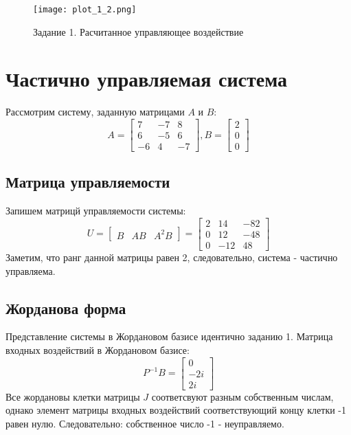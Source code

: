 \begin{figure}[]
    \centering
    \texttt{[image: plot\_1\_2.png]}
    \caption{\label{fig:The-caption-1}Задание 1. Расчитанное управляющее воздействие}
\end{figure}
\pagebreak

\section{Частично управляемая система}
Рассмотрим систему, заданную матрицами $A$ и $B$:
\begin{equation*}
    A = \begin{bmatrix}
        7 & -7 & 8 \\
        6 & -5 & 6 \\
        -6 & 4 & -7
    \end{bmatrix},
    B = \begin{bmatrix}
        2 \\ 0 \\ 0
    \end{bmatrix}
\end{equation*}

\subsection{Матрица управляемости}
Запишем матрицй управляемости системы:
\begin{equation*}
    U = \begin{bmatrix}
        B & AB & A^2B 
    \end{bmatrix}
     = 
    \begin{bmatrix}
        2 & 14 & -82 \\
        0 & 12 & -48 \\
        0 & -12 & 48
    \end{bmatrix}
\end{equation*}
Заметим, что ранг данной матрицы равен 2, следовательно, система - частично управляема.

\subsection{Жорданова форма}
Представление системы в Жордановом базисе идентично заданию 1.
Матрица входных воздействий в Жордановом базисе:
\begin{equation*}
    P^{-1}B = \begin{bmatrix}
        0 \\ -2i \\ 2i
    \end{bmatrix}
\end{equation*}
Все жордановы клетки матрицы $J$ соответсвуют разным собственным числам, однако элемент матрицы входных воздействий
соответствующий концу клетки -1 равен нулю. Следовательно: собственное число -1 - неуправляемо.

